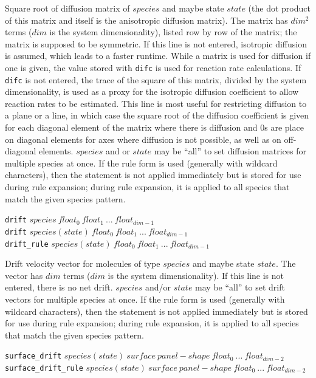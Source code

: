 \documentclass {scrbook}
\newcommand {\ttt} {\texttt}
\begin{document}
\begin{description}
Square root of diffusion matrix of $species$ and maybe state $state$ (the dot product of this matrix and itself is the anisotropic diffusion matrix). The matrix has $dim^2$ terms ($dim$ is the system dimensionality), listed row by row of the matrix; the matrix is supposed to be symmetric. If this line is not entered, isotropic diffusion is assumed, which leads to a faster runtime. While a matrix is used for diffusion if one is given, the value stored with \ttt{difc} is used for reaction rate calculations. If \ttt{difc} is not entered, the trace of the square of this matrix, divided by the system dimensionality, is used as a proxy for the isotropic diffusion coefficient to allow reaction rates to be estimated. This line is most useful for restricting diffusion to a plane or a line, in which case the square root of the diffusion coefficient is given for each diagonal element of the matrix where there is diffusion and 0s are place on diagonal elements for axes where diffusion is not possible, as well as on off-diagonal elements. $species$ and or $state$ may be ``all'' to set diffusion matrices for multiple species at once. If the rule form is used (generally with wildcard characters), then the statement is not applied immediately but is stored for use during rule expansion; during rule expansion, it is applied to all species that match the given species pattern.

\item{\ttt{drift} $species\ float_0\ float_1\ ...\ float_{dim-1}$\\
\ttt{drift} $species(state)\ float_0\ float_1\ ...\ float_{dim-1}$\\
\ttt{drift\_rule} $species(state)\ float_0\ float_1\ ...\ float_{dim-1}$}

Drift velocity vector for molecules of type $species$ and maybe state $state$. The vector has $dim$ terms ($dim$ is the system dimensionality). If this line is not entered, there is no net drift. $species$ and/or $state$ may be ``all'' to set drift vectors for multiple species at once. If the rule form is used (generally with wildcard characters), then the statement is not applied immediately but is stored for use during rule expansion; during rule expansion, it is applied to all species that match the given species pattern.

\item{\ttt{surface\_drift} $species(state)\ surface\ panel-shape\ float_0\ ...\ float_{dim-2}$\\
\ttt{surface\_drift\_rule} $species(state)\ surface\ panel-shape\ float_0\ ...\ float_{dim-2}$}


\end{description}
\end{document}
